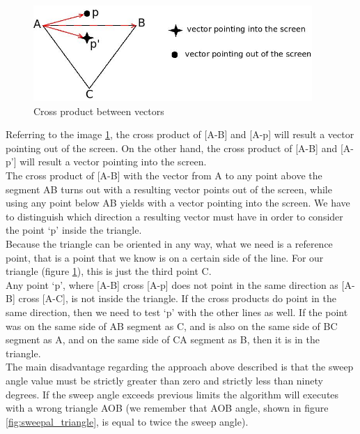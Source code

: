 \begin{figure}[!h]
  \begin{center}
    \includegraphics[width=300pt]{img/sweepal_crossproductABC.jpeg} 
    \caption{Cross product between vectors}
    \label{fig:sweepal_crossproductABC}
  \end{center}
\end{figure}

Referring to the image \ref{fig:sweepal_crossproductABC}, the cross
product of [A-B] and [A-p] will result a vector
pointing out of the screen. On the other hand, the cross product
of [A-B] and [A-p'] will result a vector pointing
into the screen.
\\
The cross product of [A-B] with the vector from A to any point above
the segment AB turns out with a resulting vector
points out of the screen, while using any point below AB yields
with a vector pointing into the screen. We have to
distinguish which direction a resulting vector must have in order to
consider the point `p' inside the triangle.
\\
Because the triangle can be oriented in any way, what we need is a
reference point, that is a point that we know is
on a certain side of the line. For our triangle (figure
\ref{fig:sweepal_crossproductABC}), this is just the third
point C.
\\
Any point `p', where [A-B] cross [A-p] does not point in the same
direction as [A-B] cross [A-C], is not inside the
triangle. If the cross products do point in the same direction, then
we need to test `p' with the other lines as well.
If the point was on the same side of AB segment as C, and is also on the
same side of BC segment as A, and on the same
side of CA segment as B, then it is in the triangle.
\\
The main disadvantage regarding the approach above described is that the
sweep angle value must be strictly greater
than zero and strictly less than ninety degrees. If the sweep angle exceeds
previous limits the algorithm will executes
with a wrong triangle AOB (we remember that AOB angle, shown in figure
\ref{fig:sweepal_triangle}, is equal to twice
the sweep angle).


